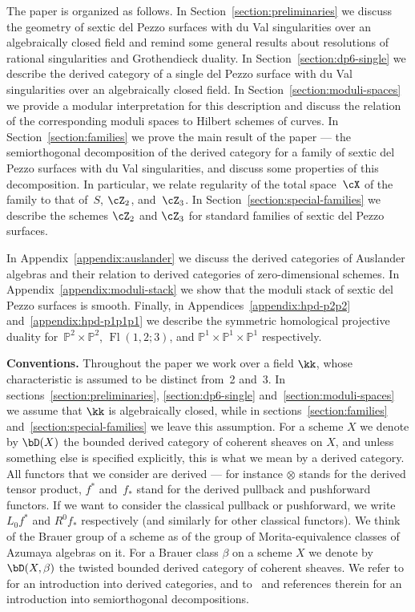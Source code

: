 \documentclass[11pt]{amsart}
\renewcommand{\P}{{\mathbb{P}}}
\DeclareMathOperator{\Fl}{\mathrm{Fl}}
\theoremstyle{plain}
\theoremstyle{definition}
\theoremstyle{remark}
\begin{document}

The paper is organized as follows.
In Section~\ref{section:preliminaries} we discuss the geometry of sextic del Pezzo surfaces with du Val singularities 
over an algebraically closed field and remind some general results about resolutions of rational singularities and Grothendieck duality.
In Section~\ref{section:dp6-single} we describe the derived category of a single del Pezzo surface with du Val singularities 
over an algebraically closed field.
In Section~\ref{section:moduli-spaces} we provide a modular interpretation for this description 
and discuss the relation of the corresponding moduli spaces to Hilbert schemes of curves.
In Section~\ref{section:families} we prove the main result of the paper --- the semiorthogonal decomposition 
of the derived category for a family of sextic del Pezzo surfaces with du Val singularities,
and discuss some properties of this decomposition.
In particular, we relate regularity of the total space~$\cX$ of the family to that of~$S$, $\cZ_2$, and~$\cZ_3$.
In Section~\ref{section:special-families} we describe the schemes $\cZ_2$ and $\cZ_3$ for standard families of sextic del Pezzo surfaces.

In Appendix~\ref{appendix:auslander} we discuss the derived categories of Auslander algebras and their relation to derived categories of zero-dimensional schemes.
In Appendix~\ref{appendix:moduli-stack} we show that the moduli stack of sextic del Pezzo surfaces is smooth.
Finally, in Appendices~\ref{appendix:hpd-p2p2} and~\ref{appendix:hpd-p1p1p1} we describe the symmetric homological projective duality for~$\P^2 \times \P^2$, $\Fl(1,2;3)$, and $\P^1 \times \P^1 \times \P^1$ respectively.


{\bf Conventions.}
Throughout the paper we work over a field $\kk$, whose characteristic is assumed to be distinct from~2 and~3.
In sections~\ref{section:preliminaries}, \ref{section:dp6-single} and~\ref{section:moduli-spaces} we assume 
that $\kk$ is algebraically closed, while in sections~\ref{section:families} and~\ref{section:special-families} we leave this assumption.
For a scheme $X$ we denote by $\bD(X)$ the bounded derived category of coherent sheaves on $X$, 
and unless something else is specified explicitly, this is what we mean by a derived category.
All functors that we consider are derived --- for instance $\otimes$ stands for the derived tensor product, 
$f^*$ and~$f_*$ stand for the derived pullback and pushforward functors.
If we want to consider the classical pullback or pushforward, we write $L_0f^*$ and $R^0f_*$ respectively 
(and similarly for other classical functors).
We think of the Brauer group of a scheme as of the group of Morita-equivalence classes of Azumaya algebras on it.
For a Brauer class $\beta$ on a scheme $X$ we denote by $\bD(X,\beta)$ the twisted bounded derived category of coherent sheaves.
We refer to~\cite{huybrechts} for an introduction into derived categories, and to~\cite{icm2014} and references therein 
for an introduction into semiorthogonal decompositions.
\end{document}
